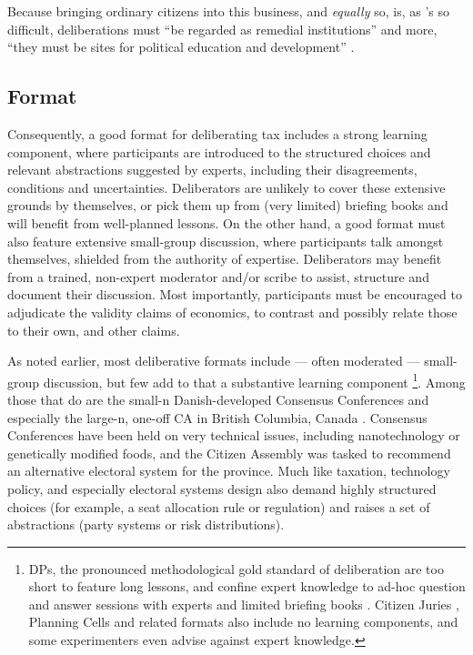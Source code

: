Because bringing ordinary citizens into this business, and \emph{equally} so, is, as \citeauthor{Rosenberg-2002-aa}'s so difficult, deliberations must ``be regarded as remedial institutions'' \citeyearpar[12]{Rosenberg-2007-aa} and more, ``they must be sites for political education and development'' \citeyearpar[13]{Rosenberg-2007-aa}.

\subsection{Format}
Consequently, a good format for deliberating tax includes a strong learning component, where participants are introduced to the structured choices and relevant abstractions suggested by experts, including their disagreements, conditions and uncertainties.
Deliberators are unlikely to cover these extensive grounds by themselves, or pick them up from (very limited) briefing books and will benefit from well-planned lessons.
On the other hand, a good format must also feature extensive small-group discussion, where participants talk amongst themselves, shielded from the authority of expertise.
Deliberators may benefit from a trained, non-expert moderator and/or scribe to assist, structure and document their discussion.
Most importantly, participants must be encouraged to adjudicate the validity claims of economics, to contrast and possibly relate those to their own, and other claims.

As noted earlier, most deliberative formats include --- often moderated --- small-group discussion, but few add to that a substantive learning component
\footnote{
	\glspl{DP}, the pronounced methodological gold standard of deliberation \citep{Mansbridge2010} are too short to feature long lessons, and confine expert knowledge to ad-hoc question and answer sessions with experts and limited briefing books \citep{Fishkin2009}.
	Citizen Juries \citep{SmithWales-2000-aa}, Planning Cells \citep{Dienel-1999-aa} and related formats also include no learning components, and some experimenters even advise against expert knowledge.}. %
Among those that do are the small-n Danish-developed Consensus Conferences \citep{Grundahl1995} and especially the large-n, one-off \gls{CA} in British Columbia, Canada \citep{Citizen-2004-aa}.
Consensus Conferences have been held on very technical issues, including nanotechnology \citep{LeeKleinman2007} or genetically modified foods, and the Citizen Assembly was tasked to recommend an alternative electoral system for the province.
Much like taxation, technology policy, and especially electoral systems design also demand highly structured choices  (for example, a seat allocation rule or regulation) and raises a set of abstractions (party systems or risk distributions).

